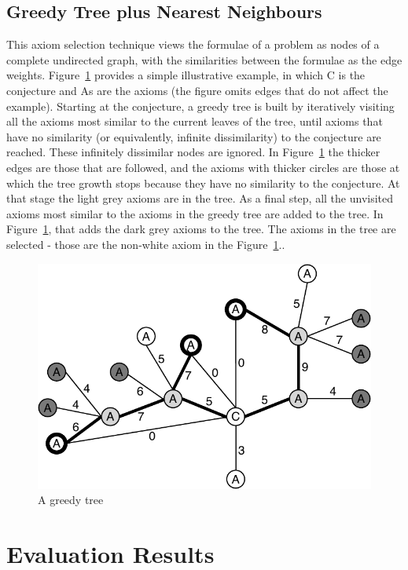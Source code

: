 \documentclass[]{ceurart}
\begin{document}
\subsection{Greedy Tree plus Nearest Neighbours}
\label{Zihao}

This axiom selection technique views the formulae of a problem as nodes
of a complete undirected graph, with the similarities between the formulae 
as the edge weights.
Figure~\ref{GreedyTree} provides a simple illustrative example, in which
\textsf{C} is the conjecture and \textsf{A}s are the axioms (the figure
omits edges that do not affect the example).
Starting at the conjecture, a greedy tree is built by iteratively visiting all
the axioms most similar to the current leaves of the tree, until axioms that 
have no similarity (or equivalently, infinite dissimilarity) 
to the conjecture are reached. 
These infinitely dissimilar nodes are ignored.
In Figure~\ref{GreedyTree} the thicker edges are those that are followed,
and the axioms with thicker circles are those at which the tree growth 
stops because they have no similarity to the conjecture.
At that stage the light grey axioms are in the tree.
As a final step, all the unvisited axioms most similar to the axioms in the 
greedy tree are added to the tree.
In Figure~\ref{GreedyTree}, that adds the dark grey axioms to the tree.
The axioms in the tree are selected - those are the non-white axiom in
the Figure~\ref{GreedyTree}..

\begin{figure}
\centering
\includegraphics[width=0.5\linewidth]{GreedyTree+NN.pdf}
\caption{A greedy tree}
\label{GreedyTree}
\end{figure}

\section{Evaluation Results}
\label{Results}
\end{document}
